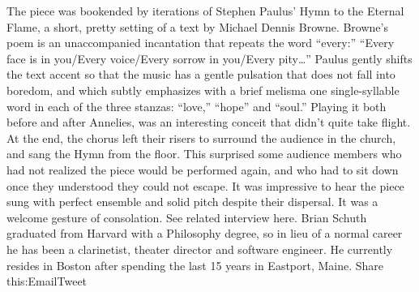 The piece was bookended by iterations of Stephen Paulus’ Hymn to the Eternal Flame, a short, pretty setting of a text by Michael Dennis Browne. Browne’s poem is an unaccompanied incantation that repeats the word “every:” “Every face is in you/Every voice/Every sorrow in you/Every pity…” Paulus gently shifts the text accent so that the music has a gentle pulsation that does not fall into boredom, and which subtly emphasizes with a brief melisma one single-syllable word in each of the three stanzas: “love,” “hope” and “soul.” Playing it both before and after Annelies, was an interesting conceit that didn’t quite take flight. At the end, the chorus left their risers to surround the audience in the church, and sang the Hymn from the floor. This surprised some audience members who had not realized the piece would be performed again, and who had to sit down once they understood they could not escape. It was impressive to hear the piece sung with perfect ensemble and solid pitch despite their dispersal. It was a welcome gesture of consolation.
See related interview here.
Brian Schuth graduated from Harvard with a Philosophy degree, so in lieu of a normal career he has been a clarinetist, theater director and software engineer. He currently resides in Boston after spending the last 15 years in Eastport, Maine.
Share this:EmailTweet